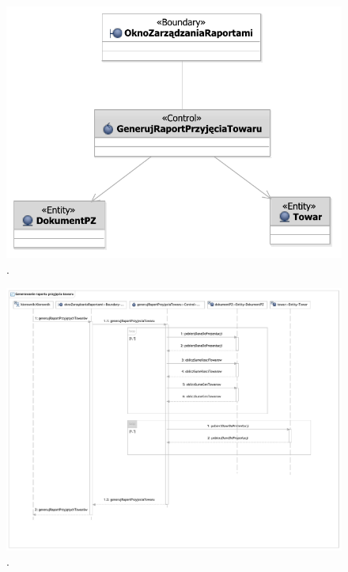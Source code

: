 \begin{figure}[H]
  \centering
  \includegraphics[angle=\ecbangle, scale=\ecbscale]{../img/usecase/pu7ecb.pdf}
  \caption{.}
\end{figure}
\begin{figure}[H]
  \centering
  \includegraphics[angle=\seqangle, scale=0.5]{../img/usecase/pu7seq.pdf}
  \caption{.}
\end{figure}
\newpage
